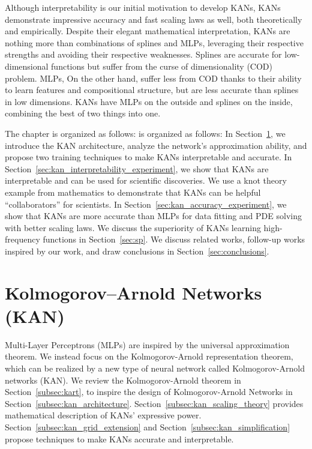 \documentclass[12pt]{caltech_thesis}
\numberwithin{equation}{section}
\begin{document}
Although interpretability is our initial motivation to develop KANs, KANs demonstrate impressive accuracy and fast scaling laws as well, both theoretically and empirically. Despite their elegant mathematical interpretation, KANs are nothing more than combinations of splines and MLPs, leveraging their respective strengths and avoiding their respective weaknesses. Splines are accurate for low-dimensional functions %
but suffer from the curse of dimensionality (COD) problem. %
MLPs, On the other hand, suffer less from COD thanks to their ability to learn features and compositional structure, but are less accurate than splines in low dimensions. %
KANs have MLPs on the outside and splines on the inside, combining the best of two things into one.

The chapter is organized as follows: is organized as follows: In Section~\ref{sec:KAN}, we introduce the KAN architecture, analyze the network's approximation ability, and propose two training techniques to make KANs interpretable and accurate. In Section~\ref{sec:kan_interpretability_experiment}, we show that KANs are interpretable and can be used for scientific discoveries. We use a knot theory example from mathematics 
to demonstrate that KANs can be helpful ``collaborators'' for scientists. In Section~\ref{sec:kan_accuracy_experiment}, we show that KANs are more accurate than MLPs for data fitting and PDE solving with better scaling laws. We discuss the superiority of KANs learning high-frequency functions in Section~\ref{sec:sp}. We discuss related works, follow-up works inspired by our work, and draw conclusions in Section~\ref{sec:conclusions}.  

\section{Kolmogorov–Arnold Networks (KAN)}\label{sec:KAN}

Multi-Layer Perceptrons (MLPs) are inspired by the universal approximation theorem. We instead focus on the Kolmogorov-Arnold representation theorem, which can be realized by a new type of neural network called Kolmogorov-Arnold networks (KAN). We review the Kolmogorov-Arnold theorem in Section~\ref{subsec:kart}, to inspire the design of Kolmogorov-Arnold Networks in Section~\ref{subsec:kan_architecture}. Section~\ref{subsec:kan_scaling_theory} provides mathematical description of KANs' expressive power. Section~\ref{subsec:kan_grid_extension} and Section~\ref{subsec:kan_simplification} propose techniques to make KANs accurate and interpretable.
\end{document}
